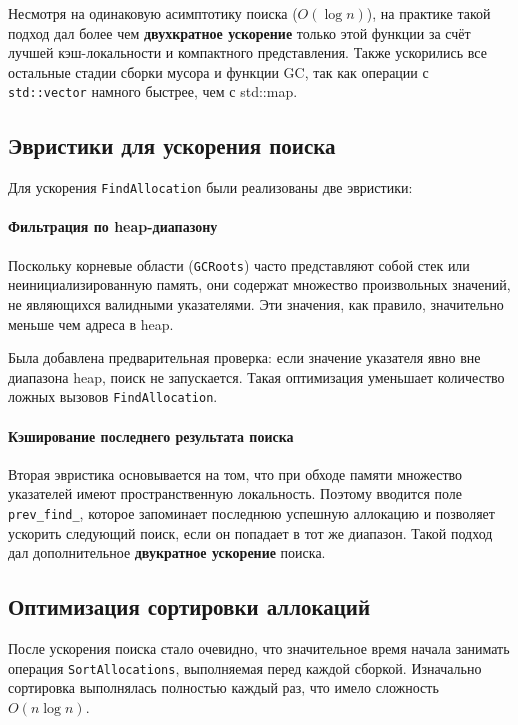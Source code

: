 Несмотря на одинаковую асимптотику поиска (\(O(\log n)\)), на практике такой подход дал более чем \textbf{двухкратное ускорение} только этой функции за счёт лучшей кэш-локальности и компактного представления. Также ускорились все остальные стадии сборки мусора и функции GC, так как операции с \texttt{std::vector} намного быстрее, чем с std::map.

\subsection{Эвристики для ускорения поиска}

Для ускорения \texttt{FindAllocation} были реализованы две эвристики:

\paragraph{Фильтрация по heap-диапазону}

Поскольку корневые области (\texttt{GCRoots}) часто представляют собой стек или неинициализированную память, они содержат множество произвольных значений, не являющихся валидными указателями. Эти значения, как правило, значительно меньше чем адреса в heap.

Была добавлена предварительная проверка: если значение указателя явно вне диапазона heap, поиск не запускается. Такая оптимизация уменьшает количество ложных вызовов \texttt{FindAllocation}.

\paragraph{Кэширование последнего результата поиска}

Вторая эвристика основывается на том, что при обходе памяти множество указателей имеют пространственную локальность. Поэтому вводится поле \texttt{prev\_find\_}, которое запоминает последнюю успешную аллокацию и позволяет ускорить следующий поиск, если он попадает в тот же диапазон. Такой подход дал дополнительное \textbf{двукратное ускорение} поиска.

\subsection{Оптимизация сортировки аллокаций}

После ускорения поиска стало очевидно, что значительное время начала занимать операция \texttt{SortAllocations}, выполняемая перед каждой сборкой. Изначально сортировка выполнялась полностью каждый раз, что имело сложность \(O(n \log n)\).

